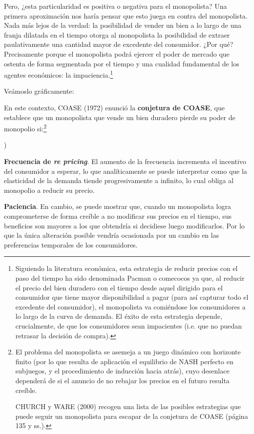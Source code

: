 \documentclass[10pt,a4paper]{article}
\newcounter{alphaitem}
\newenvironment{la}
      {\begin{list}{\alph{alphaitem})}{%
          \usecounter{alphaitem}%
          \setlength{\leftmargin}{1cm}%
          \setlength{\parskip}{3pt}%
          \setlength{\itemsep}{0pt}%
          \setlength{\parsep}{0pt}%
      }}
      {\end{list}}
\begin{document}
Pero, ¿esta particularidad es positiva o negativa para el monopolista? Una primera aproximación nos haría pensar que esto juega en contra del monopolista. Nada más lejos de la verdad: la posibilidad de vender un bien a lo largo de una franja dilatada en el tiempo otorga al monopolista la posibilidad de extraer paulativamente una cantidad mayor de excedente del consumidor. ¿Por qué? Precisamente porque el monopolista podrá ejercer el poder de mercado que ostenta de forma segmentada por el tiempo y una cualidad fundamental de los agentes económicos: la impaciencia.\footnote{%
    Siguiendo la literatura económica, esta estrategia de reducir precios con el paso del tiempo ha sido denominada Pacman o comecocos ya que, al reducir el precio del bien duradero con el tiempo desde aquel dirigido para el consumidor que tiene mayor disponibilidad a pagar (para así capturar todo el excedente del consumidor), el monopolista va comiéndose los consumidores a lo largo de la curva de demanda. El éxito de esta estrategia depende, crucialmente, de que los consumidores sean impacientes (i.e. que no puedan retrasar la decisión de compra).
} 

Veámoslo gráficamente:


En este contexto, COASE (1972) enunció la \textbf{conjetura de COASE}, que establece que un monopolista que vende un bien duradero pierde su poder de monopolio si:\footnote{%
    El problema del monopolista se asemeja a un juego dinámico con horizonte finito (por lo que resulta de aplicación el equilibrio de NASH perfecto en subjuegos, y el procedimiento de inducción hacia atrás), cuyo desenlace dependerá de si el anuncio de no rebajar los precios en el futuro resulta creíble.

CHURCH y WARE (2000) recogen una lista de las posibles estrategias que puede seguir un monopolista para escapar de la conjetura de COASE (página 135 y ss.).
}
\begin{la}
    \item \textbf{Frecuencia de \textit{re pricing}}. El aumento de la frecuencia incrementa el incentivo del consumidor a esperar, lo que analíticamente se puede interpretar como que la elasticidad de la demanda tiende progresivamente a infinito, lo cual obliga al monopolio a reducir su precio. 
    \item \textbf{Paciencia}. En cambio, se puede mostrar que, cuando un monopolista logra comprometerse de forma creíble a no modificar sus precios en el tiempo, sus beneficios son mayores a los que obtendría si decidiese luego modificarlos. Por lo que la única alteración posible vendría ocasionada por un cambio en las preferencias temporales de los consumidores.
\end{la} 
\end{document}
